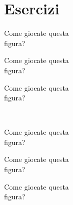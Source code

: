 \documentclass[../corsofiori.tex]{subfiles}
\begin{document}
\clearpage
\section*{Esercizi}

\bigskip


\begin{minipage}[h][3cm][t]{.3\linewidth}

    Come giocate questa\\ figura?
\end{minipage}
\hfill
\begin{minipage}[h][3cm][t]{.3\linewidth}

    Come giocate questa\\ figura?
\end{minipage}
\hfill
\begin{minipage}[h][3cm][t]{.3\linewidth}

    Come giocate questa\\ figura?
\end{minipage}
\hfill
\bigskip
\\
\begin{minipage}[h][3cm][t]{.3\linewidth}

    Come giocate questa\\ figura?
\end{minipage}
\hfill
\begin{minipage}[h][3cm][t]{.3\linewidth}

    Come giocate questa\\figura?
\end{minipage}
\hfill
\begin{minipage}[h][3cm][t]{.3\linewidth}

    Come giocate questa\\figura?
\end{minipage}
\hfill
\end{document}
